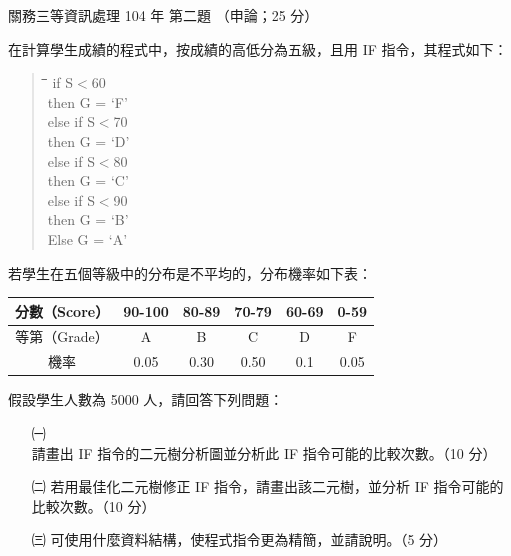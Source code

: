 \begin{pastexam}[label={px:gw3-104-ds-02}]{關務三等資訊處理 104 年 第二題}
（申論；25 分）

在計算學生成績的程式中，按成績的高低分為五級，且用 IF 指令，其程式如下：
\begin{quote}
\small
\begin{tabbing}
\hspace*{2em}\=\hspace*{2em}\=\hspace*{2em}\=\hspace*{2em}\=\hspace*{2em}\=\kill
if S$<$60\\
\> then G = `F'\\
else if S$<$70\\
\>\> then G = `D'\\
\> else if S$<$80\\
\>\>\> then G = `C'\\
\>\> else if S$<$90\\
\>\>\>\> then G = `B'\\
\>\>\> Else G = `A'
\end{tabbing}
\end{quote}
若學生在五個等級中的分布是不平均的，分布機率如下表：
\begin{center}
\begin{tabular}{|c|c|c|c|c|c|}
\hline
分數（Score） & 90-100 & 80-89 & 70-79 & 60-69 & 0-59 \\ \hline
等第（Grade） & A & B & C & D & F \\ \hline
機率 & 0.05 & 0.30 & 0.50 & 0.1 & 0.05 \\ \hline
\end{tabular}
\end{center}
假設學生人數為 5000 人，請回答下列問題：
\begin{itemize}[leftmargin=2.2em, nosep]
\item[㈠] 請畫出 IF 指令的二元樹分析圖並分析此 IF 指令可能的比較次數。（10 分）
\item[㈡] 若用最佳化二元樹修正 IF 指令，請畫出該二元樹，並分析 IF 指令可能的比較次數。（10 分）
\item[㈢] 可使用什麼資料結構，使程式指令更為精簡，並請說明。（5 分）
\end{itemize}
\end{pastexam}

